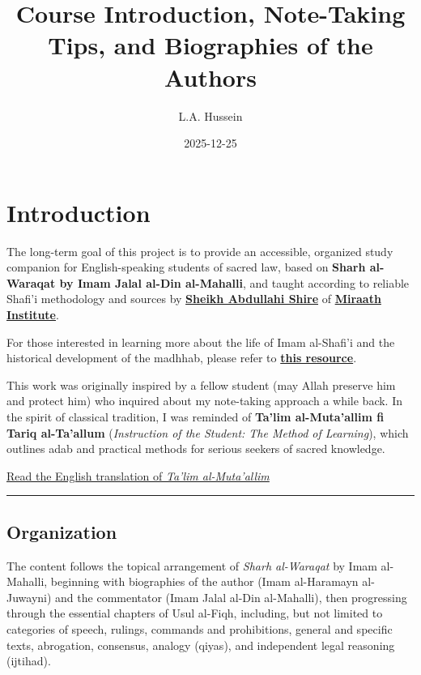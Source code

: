 \documentclass[
  a4paper,
  DIV=11,
  numbers=noendperiod]{scrartcl}
\title{Course Introduction, Note-Taking Tips, and Biographies of the
Authors}
\author{L.A. Hussein}
\date{2025-12-25}
\renewcommand*\contentsname{Table of contents}
\newcommand\contentsname{Table of contents}
\begin{document}
\maketitle

\renewcommand*\contentsname{Table of contents}
{
\hypersetup{linkcolor=}
\setcounter{tocdepth}{3}
\tableofcontents
}

\section{Introduction}\label{sec-intro}

The long-term goal of this project is to provide an accessible,
organized study companion for English-speaking students of sacred law,
based on \textbf{Sharh al-Waraqat by Imam Jalal al-Din al-Mahalli}, and
taught according to reliable Shafi'i methodology and sources by
\href{https://www.instagram.com/abdullahishire_/?hl=en}{\textbf{Sheikh
Abdullahi Shire}} of
\href{https://www.instagram.com/miraathinstitute/?hl=en}{\textbf{Miraath
Institute}}.

For those interested in learning more about the life of Imam al-Shafi'i
and the historical development of the madhhab, please refer to
\href{https://lisanproject.github.io/FiqhalManhaji/course-material.html}{\textbf{this
resource}}.

This work was originally inspired by a fellow student (may Allah
preserve him and protect him) who inquired about my note-taking approach
a while back. In the spirit of classical tradition, I was reminded of
\textbf{Ta'lim al-Muta'allim fi Tariq al-Ta'allum} (\emph{Instruction of
the Student: The Method of Learning}), which outlines adab and practical
methods for serious seekers of sacred knowledge.

\href{https://ia801504.us.archive.org/31/items/53330826InstructionOfTheStudentTaAlimAlMutaAllimTheMethodOfLearning/53330826-Instruction-of-the-Student-Ta-alim-al-Muta-allim-The-Method-of-Learning.pdf}{Read
the English translation of \emph{Ta'lim al-Muta'allim}}

\begin{center}\rule{0.5\linewidth}{0.5pt}\end{center}

\subsection{Organization}\label{organization}

The content follows the topical arrangement of \emph{Sharh al-Waraqat}
by Imam al-Mahalli, beginning with biographies of the author (Imam
al-Haramayn al-Juwayni) and the commentator (Imam Jalal al-Din
al-Mahalli), then progressing through the essential chapters of Usul
al-Fiqh, including, but not limited to categories of speech, rulings,
commands and prohibitions, general and specific texts, abrogation,
consensus, analogy (qiyas), and independent legal reasoning (ijtihad).
\end{document}
